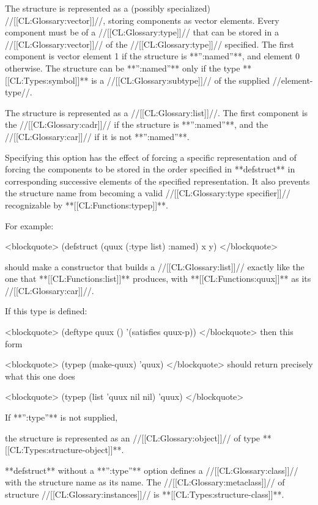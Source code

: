 
The structure is represented as a (possibly specialized) //[[CL:Glossary:vector]]//, storing components as vector elements. Every component must be of a //[[CL:Glossary:type]]// that can be stored in a //[[CL:Glossary:vector]]// of the //[[CL:Glossary:type]]// specified. The first component is vector element 1 if the structure is **'':named''**, and element 0 otherwise. The structure can be **'':named''** only if the type **[[CL:Types:symbol]]** is a //[[CL:Glossary:subtype]]// of the supplied //element-type//.


The structure is represented as a //[[CL:Glossary:list]]//. The first component is the //[[CL:Glossary:cadr]]// if the structure is **'':named''**, and the //[[CL:Glossary:car]]// if it is not **'':named''**. \endlist

Specifying this option has the effect of forcing a specific representation and of forcing the components to be stored in the order specified in **defstruct** in corresponding successive elements of the specified representation. It also prevents the structure name from becoming a valid //[[CL:Glossary:type specifier]]// recognizable by **[[CL:Functions:typep]]**.

For example:

<blockquote> (defstruct (quux (:type list) :named) x y) </blockquote>

should make a constructor that builds a //[[CL:Glossary:list]]// exactly like the one that **[[CL:Functions:list]]** produces, with **[[CL:Functions:quux]]** as its //[[CL:Glossary:car]]//.

If this type is defined:

<blockquote> (deftype quux () '(satisfies quux-p)) </blockquote> then this form

<blockquote> (typep (make-quux) 'quux) </blockquote> should return precisely what this one does

<blockquote> (typep (list 'quux nil nil) 'quux) </blockquote>

If **'':type''** is not supplied,

the structure is represented as an //[[CL:Glossary:object]]// of type **[[CL:Types:structure-object]]**.

**defstruct** without a **'':type''** option defines a //[[CL:Glossary:class]]// with the structure name as its name. The //[[CL:Glossary:metaclass]]// of structure //[[CL:Glossary:instances]]// is **[[CL:Types:structure-class]]**.

